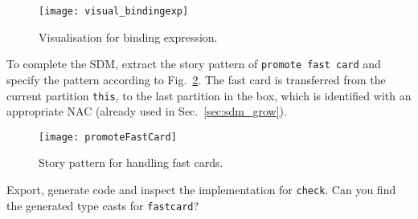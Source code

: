 \begin{figure}[htbp]
\begin{center}
  \texttt{[image: visual\_bindingexp]}
  \caption{Visualisation for binding expression.}  
  \label{fig:sdm_fastcard_4}
\end{center}
\end{figure}

To complete the SDM, extract the story pattern of \texttt{promote fast card} and specify the pattern according to Fig.~\ref{fig:sdm_fastcard_5}.
The fast card is transferred from the current partition \texttt{this}, to the last partition in the box, which is identified with an appropriate \mbox{NAC}
(already used in Sec.~\ref{sec:sdm_grow}).

\begin{figure}[htbp]
\begin{center}
  \texttt{[image: promoteFastCard]}
  \caption{Story pattern for handling fast cards.}  
  \label{fig:sdm_fastcard_5}
\end{center}
\end{figure}

Export, generate code and inspect the implementation for \texttt{check}.  Can you find the generated type casts for \texttt{fastcard}?


